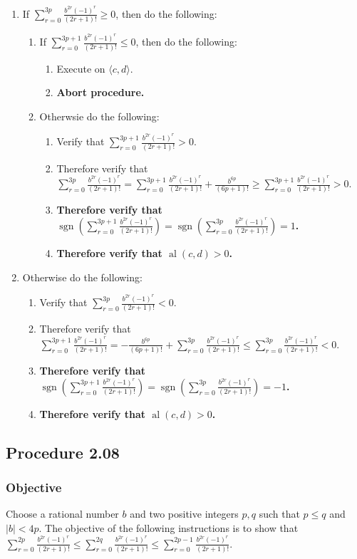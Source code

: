 \documentclass[twocolumn]{article}
\DeclareMathOperator{\sgn}{sgn}
\DeclareMathOperator{\al}{al}
\newcommand{\procedure}[2][]{\subsection*{Procedure #2 \ifthenelse{\equal{#1}{}}{}{(#1)}}\label{sec:procedure #2}}
\newcommand{\objective}{\subsubsection*{Objective}}
\newcommand{\procedurehr}[2][]{\hyperref[sec:procedure #2]{\ifthenelse{\equal{#1}{}}{procedure #2}{#1}}}
\begin{document}
				\begin{enumerate}
					\item If $\sum_{r=0}^{3p}\frac{b^{2r}(-1)^r}{(2r+1)!}\ge 0$, then do the following:
					\begin{enumerate}
						\item If $\sum_{r=0}^{3p+1}\frac{b^{2r}(-1)^r}{(2r+1)!}\le 0$, then do the following:
						\begin{enumerate}
							\item Execute \procedurehr{2.06} on $\langle c,d\rangle$.
							\item \textbf{Abort procedure.}
						\end{enumerate}
						\item Otherwsie do the following:
						\begin{enumerate}
							\item Verify that $\sum_{r=0}^{3p+1}\frac{b^{2r}(-1)^r}{(2r+1)!}>0$.
							\item Therefore verify that $\sum_{r=0}^{3p}\frac{b^{2r}(-1)^r}{(2r+1)!}=\sum_{r=0}^{3p+1}\frac{b^{2r}(-1)^r}{(2r+1)!}+\frac{b^{6p}}{(6p+1)!}\ge\sum_{r=0}^{3p+1}\frac{b^{2r}(-1)^r}{(2r+1)!}>0$.
							\item \textbf{Therefore verify that $\sgn(\sum_{r=0}^{3p+1}\frac{b^{2r}(-1)^r}{(2r+1)!})=\sgn(\sum_{r=0}^{3p}\frac{b^{2r}(-1)^r}{(2r+1)!})=1$.}
							\item \textbf{Therefore verify that $\al(c,d)>0$.}
						\end{enumerate}
					\end{enumerate}
					\item Otherwise do the following:
					\begin{enumerate}
						\item Verify that $\sum_{r=0}^{3p}\frac{b^{2r}(-1)^r}{(2r+1)!}<0$.
						\item Therefore verify that $\sum_{r=0}^{3p+1}\frac{b^{2r}(-1)^r}{(2r+1)!}=-\frac{b^{6p}}{(6p+1)!}+\sum_{r=0}^{3p}\frac{b^{2r}(-1)^r}{(2r+1)!}\le\sum_{r=0}^{3p}\frac{b^{2r}(-1)^r}{(2r+1)!}<0$.
						\item \textbf{Therefore verify that $\sgn(\sum_{r=0}^{3p+1}\frac{b^{2r}(-1)^r}{(2r+1)!})=\sgn(\sum_{r=0}^{3p}\frac{b^{2r}(-1)^r}{(2r+1)!})=-1$.}
						\item \textbf{Therefore verify that $\al(c,d)>0$.}
					\end{enumerate}
				\end{enumerate}
		\procedure{2.08}
			\objective
				Choose a rational number $b$ and two positive integers $p,q$ such that $p\le q$ and $\lvert b\rvert<4p$. The objective of the following instructions is to show that $\sum_{r=0}^{2p}\frac{b^{2r}(-1)^r}{(2r+1)!}\le\sum_{r=0}^{2q}\frac{b^{2r}(-1)^r}{(2r+1)!}\le\sum_{r=0}^{2p-1}\frac{b^{2r}(-1)^r}{(2r+1)!}$.
\end{document}
